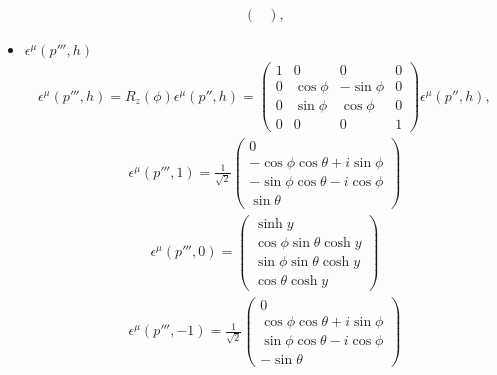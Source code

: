 \documentclass[11pt]{article}
\def\eps{\epsilon}
\begin{document}
\begin{itemize}
\begin{eqnarray}
\begin{pmatrix}
        \end{pmatrix},
    \end{eqnarray}
    \item $\eps^\mu(p{'''},h)$
    \begin{eqnarray}
        \eps^\mu(p{'''},h) = R_z(\phi)   \eps^\mu(p{''},h)=
        \begin{pmatrix}
            1 & 0 & 0 & 0\\
            0 & \cos\phi & -\sin\phi & 0 \\
            0 & \sin\phi & \cos\phi & 0 \\
            0 & 0 & 0 & 1
           \end{pmatrix}
           \eps^\mu(p{''},h),
    \end{eqnarray}
    \begin{eqnarray}
        \eps^\mu(p{'''},1) = \frac{1}{\sqrt 2}
        \begin{pmatrix}
            0 \\ -\cos\phi\cos\theta+i\sin\phi \\ -\sin\phi\cos\theta-i\cos\phi \\ \sin\theta
        \end{pmatrix}
    \end{eqnarray}
    \begin{eqnarray}
        \eps^\mu(p{'''},0) =
        \begin{pmatrix}
            \sinh y \\ \cos\phi\sin\theta\cosh y \\ \sin\phi\sin\theta\cosh y \\ \cos\theta\cosh y
        \end{pmatrix}
    \end{eqnarray}
    \begin{eqnarray}
        \eps^\mu(p{'''},-1) = \frac{1}{\sqrt 2}
        \begin{pmatrix}
            0 \\ \cos\phi\cos\theta+i\sin\phi \\ \sin\phi\cos\theta-i\cos\phi \\ -\sin\theta
        \end{pmatrix}
    \end{eqnarray}
\end{itemize}
\end{document}

